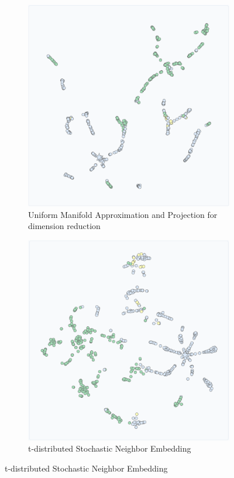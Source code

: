 \begin{figure}[!ph]
    \centering

    \begin{subfigure}[c]{0.48\linewidth}
        \centering
        \includegraphics[width=\linewidth]{images/DR example UMAP.png}
        \caption{Uniform Manifold Approximation and Projection for dimension reduction}
        \label{fig:DR example UMAP}
    \end{subfigure}
    \hfill
    \begin{subfigure}[c]{0.48\linewidth}
        \centering
        \includegraphics[width=\linewidth]{images/DR example t-sne.png}
        \caption{t-distributed Stochastic Neighbor Embedding}
        \label{fig:DR example t-SNE}
    \end{subfigure}
    

\end{figure}
